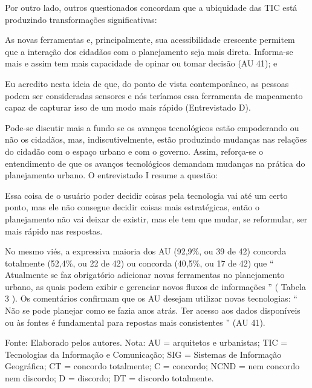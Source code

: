\documentclass{article}
\begin{document}

Por outro lado, outros questionados concordam que a ubiquidade das TIC está
					produzindo transformações significativas: 

As novas ferramentas e, principalmente, sua acessibilidade crescente permitem
						que a interação dos cidadãos com o planejamento seja mais direta. Informa-se
						mais e assim tem mais capacidade de opinar ou tomar decisão %
(AU 41);
							e%


Eu acredito nesta ideia de que, do ponto de vista contemporâneo, as pessoas
						podem ser consideradas sensores e nós teríamos essa ferramenta de mapeamento
						capaz de capturar isso de um modo mais rápido %
(Entrevistado
							D).%


Pode-se discutir mais a fundo se os avanços tecnológicos estão empoderando ou não
					os cidadãos, mas, indiscutivelmente, estão produzindo mudanças nas relações do
					cidadão com o espaço urbano e com o governo. Assim, reforça-se o entendimento de
					que os avanços tecnológicos demandam mudanças na prática do planejamento urbano.
					O entrevistado I resume a questão: 

Essa coisa de o usuário poder decidir coisas pela tecnologia vai até um certo
						ponto, mas ele não consegue decidir coisas mais estratégicas, então o
						planejamento não vai deixar de existir, mas ele tem que mudar, se
						reformular, ser mais rápido nas respostas.

No mesmo viés, a expressiva maioria dos AU (92,9\%, ou 39 de 42) concorda
					totalmente (52,4\%, ou 22 de 42) ou concorda (40,5\%, ou 17 de 42) que
						“%
Atualmente se faz obrigatório adicionar novas ferramentas no
						planejamento urbano, as quais podem exibir e gerenciar novos fluxos de
						informações%
” (%
Tabela 3%
). Os
					comentários confirmam que os AU desejam utilizar novas tecnologias: “%
Não
						se pode planejar como se fazia anos atrás. Ter acesso aos dados disponíveis
						ou às fontes é fundamental para repostas mais consistentes%
” (AU
					41).

Fonte: Elaborado pelos autores. Nota: AU = arquitetos e urbanistas;
								TIC = Tecnologias da Informação e Comunicação; SIG = Sistemas de
								Informação Geográfica; CT = concordo totalmente; C = concordo; NCND
								= nem concordo nem discordo; D = discordo; DT = discordo
								totalmente.
\end{document}
